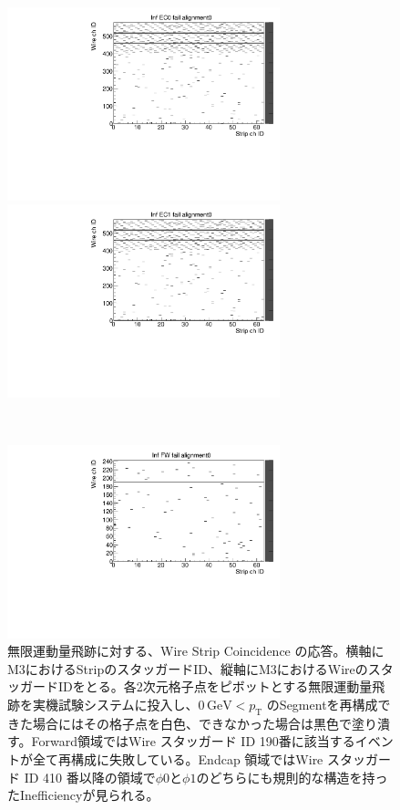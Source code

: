 \begin{figure}
    \begin{minipage}[b]{.5\linewidth}
        \centering
        \includegraphics[height=5.6cm]{fig/Test/A_InfEC0_WS.pdf}
    \end{minipage}
    \begin{minipage}[b]{.5\linewidth}
        \centering
        \includegraphics[height=5.6cm]{fig/Test/A_InfEC1_WS.pdf}
    \end{minipage}\\
    \begin{minipage}[b]{\linewidth}
        \centering
        \includegraphics[height=5.6cm]{fig/Test/A_InfFW_WS.pdf}
    \end{minipage}
    \caption[無限運動量飛跡に対する、Wire Strip Coincidence の応答]{無限運動量飛跡に対する、Wire Strip Coincidence の応答。横軸にM3におけるStripのスタッガードID、縦軸にM3におけるWireのスタッガードIDをとる。各2次元格子点をピボットとする無限運動量飛跡を実機試験システムに投入し、$0\,\mathrm{GeV} < p_\mathrm{T}$ のSegmentを再構成できた場合にはその格子点を白色、できなかった場合は黒色で塗り潰す。Forward領域ではWire スタッガード ID 190番に該当するイベントが全て再構成に失敗している。Endcap 領域ではWire スタッガード ID 410 番以降の領域で$\phi0$と$\phi1$のどちらにも規則的な構造を持ったInefficiencyが見られる。}
    \label{Inf_A_WS}
\end{figure}


